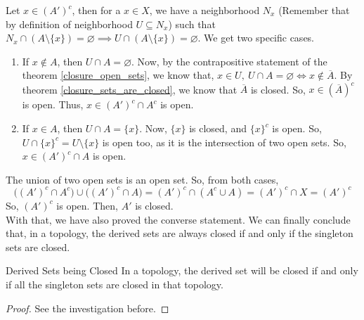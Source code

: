 \begin{Investigation}
    Let $x\in(A')^c$, then for a $x\in X$, we have a neighborhood $N_x$ (Remember that by definition of neighborhood $U\subseteq N_x$) such that $N_x\cap(A\setminus\{x\})=\varnothing\implies U\cap(A\setminus\{x\})=\varnothing$. We get two specific cases.
    \begin{enumerate}
        \item If $x\notin A$, then $U\cap A=\varnothing$. Now, by the contrapositive statement of the theorem \eqref{closure_open_sets}, we know that, $x\in U,\ U\cap A=\varnothing\iff x\notin\overline{A}$. By theorem \eqref{closure_sets_are_closed}, we know that $\overline{A}$ is closed. So, $x\in(\overline{A})^c$ is open. Thus, $x\in(A')^c\cap A^c$ is open.
        \item If $x\in A$, then $U\cap A=\{x\}$. Now, $\{x\}$ is closed, and $\{x\}^c$ is open. So, $U\cap\{x\}^c=U\setminus\{x\}$ is open too, as it is the intersection of two open sets. So, $x\in(A')^c\cap A$ is open.
    \end{enumerate}
    The union of two open sets is an open set. So, from both cases, $$\big((A')^c\cap A^c\big)\cup\big((A')^c\cap A\big)=(A')^c\cap(A^c\cup A)=(A')^c\cap X=(A')^c$$
    So, $(A')^c$ is open. Then, $A'$ is closed.\\
    With that, we have also proved the converse statement. We can finally conclude that, in a topology, the derived sets are always closed if and only if the singleton sets are closed.
\end{Investigation}
\begin{Theorem}{Derived Sets being Closed}\label{derived_set_being_closed}
    In a topology, the derived set will be closed if and only if all the singleton sets are closed in that topology.
\end{Theorem}
\begin{proof}
    See the investigation before.
\end{proof}
